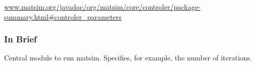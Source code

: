 \href{http://www.matsim.org/javadoc/org/matsim/core/controler/package-summary.html#controler_parameters}{www.matsim.org/javadoc/org/matsim/core/controler/package-summary.html\#controler\_parameters}


\subsubsection{In Brief}

Central module to run matsim. Specifies, for example, the number of iterations.






\umbruch







